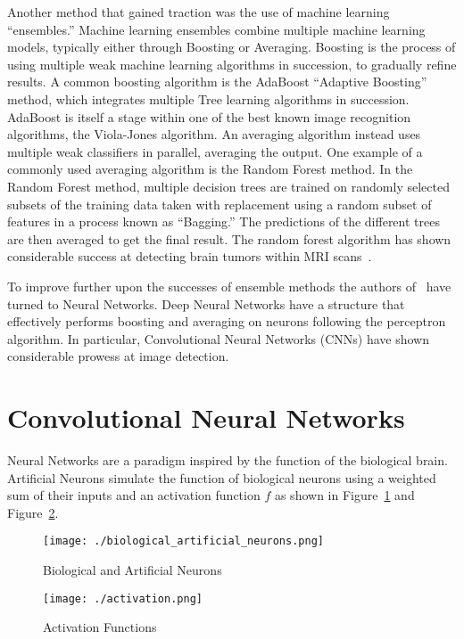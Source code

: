 \documentclass{article}
\begin{document}
Another method that gained traction was the use of machine learning
``ensembles.'' Machine learning ensembles combine multiple machine learning
models, typically either through Boosting or Averaging. Boosting is the process
of using multiple weak machine learning algorithms in succession, to gradually
refine results. A common boosting algorithm is the AdaBoost ``Adaptive
Boosting'' method, which integrates multiple Tree learning algorithms in
succession. AdaBoost is itself a stage within one of the best known image
recognition algorithms, the Viola-Jones algorithm. An averaging algorithm
instead uses multiple weak classifiers in parallel, averaging the output. One
example of a commonly used averaging algorithm is the Random Forest method. In
the Random Forest method, multiple decision trees are trained on randomly
selected subsets of the training data taken with replacement using a random
subset of features in a process known as ``Bagging.'' The predictions of the
different trees are then averaged to get the final result. The random forest
algorithm has shown considerable success at detecting brain tumors within
MRI scans~\cite{brats}.

To improve further upon the successes of ensemble methods the authors
of~\cite{saito_2016} have turned to Neural Networks. Deep Neural Networks
have a structure that effectively performs boosting and averaging on
neurons following the perceptron algorithm. In particular, Convolutional Neural
Networks (CNNs) have shown considerable prowess at image detection.

\section*{Convolutional Neural Networks}
Neural Networks are a paradigm inspired by the function of the biological brain.
Artificial Neurons simulate the function of biological neurons using a
weighted sum of their inputs and an activation function $f$ as shown
in Figure~\ref{fig:bioArtNeuron} and Figure~\ref{fig:activation}.
\begin{figure}[h]
\centering
\caption{Biological and Artificial Neurons}
\texttt{[image: ./biological\_artificial\_neurons.png]}
\label{fig:bioArtNeuron}
\end{figure}

\begin{figure}[h]
\centering
\caption{Activation Functions}
\texttt{[image: ./activation.png]}
\label{fig:activation}
\end{figure}
\end{document}
